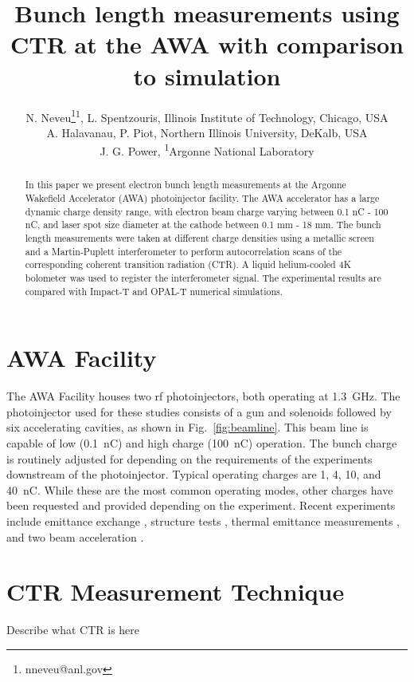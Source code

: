\documentclass[letterpaper,  %
              ]{jacow-2_3}   %
\begin{document}
\title{Bunch length measurements using CTR at the AWA with comparison to simulation}

\author{N. Neveu\thanks{nneveu@anl.gov}\textsuperscript{1}, 
	    L. Spentzouris, Illinois Institute of Technology, Chicago, USA \\
		A. Halavanau, P. Piot, Northern Illinois University, DeKalb, USA \\
	    J. G. Power, \textsuperscript{1}Argonne National Laboratory}
\maketitle

%
\begin{abstract}
In this paper we present electron bunch length measurements 
at the Argonne Wakefield Accelerator (AWA) photoinjector facility. 
The AWA accelerator has a large dynamic charge density range, 
with electron beam charge varying between 0.1 nC - 100 nC, 
and laser spot size diameter at the cathode between 0.1 mm - 18 mm. 
The bunch length measurements were taken at different charge densities 
using a metallic screen and a Martin-Puplett interferometer to perform 
autocorrelation scans of the corresponding coherent transition radiation (CTR). 
A liquid helium-cooled 4K bolometer was used to register the interferometer signal. 
The experimental results are compared with Impact-T and OPAL-T numerical simulations.
\end{abstract}


\section{AWA Facility}
The AWA Facility houses two rf photoinjectors, both 
operating at \SI{1.3}{GHz}. The photoinjector used for 
these studies consists of a gun and solenoids followed
by six accelerating cavities, as shown in Fig.~\ref{fig:beamline}. 
This beam line is capable of low (\SI{0.1}{nC}) and 
high charge (\SI{100}{nC}) operation. The bunch charge is 
routinely adjusted for depending on the requirements 
of the experiments downstream of the photoinjector.
Typical operating charges are 1, 4, 10, and \SI{40}{nC}. 
While these are the most
common operating modes, other charges have been requested 
and provided depending on the experiment.
Recent experiments include emittance exchange \cite{eex}, 
structure tests \cite{pets}, thermal emittance measurements \cite{therm}, 
and two beam acceleration \cite{tba}. 


\section{CTR Measurement Technique}
Describe what CTR is here
\end{document}

